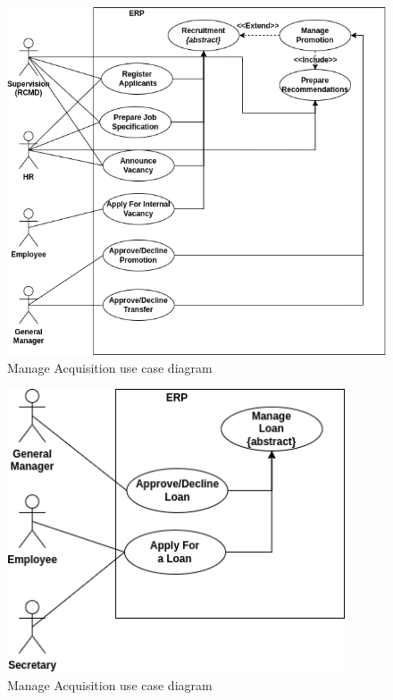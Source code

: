 \begin{figure}[!ht]
\centering
\includegraphics[width=15cm,keepaspectratio]{usecases/recruitment.drawio.png}
\caption{Manage Acquisition use case diagram }
\end{figure}


\begin{figure}[!ht]
\centering
\includegraphics[width=10cm,keepaspectratio]{usecases/loan.drawio.png}
\caption{Manage Acquisition use case diagram }
\end{figure}

